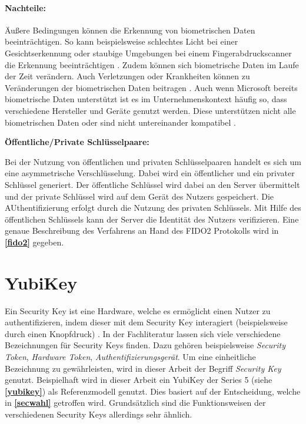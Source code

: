 \paragraph*{Nachteile:} Äußere Bedingungen können die Erkennung von biometrischen Daten beeinträchtigen. So kann beispielsweise schlechtes Licht bei einer Gesichtserkennung oder staubige Umgebungen bei einem Fingerabdruckscanner die Erkennung beeinträchtigen \cite{parmar2022comprehensive}. Zudem können sich biometrische Daten im Laufe der Zeit verändern. Auch Verletzungen oder Krankheiten können zu Veränderungen der biometrischen Daten beitragen \cite{boonkrong2012security}. Auch wenn Microsoft bereits biometrische Daten unterstützt ist es im Unternehmenskontext häufig so, dass verschiedene Hersteller und Geräte genutzt werden. Diese unterstützen nicht alle biometrischen Daten oder sind nicht untereinander kompatibel \cite{parmar2022comprehensive}.

\textbf{Öffentliche/Private Schlüsselpaare:}

Bei der Nutzung von öffentlichen und privaten Schlüsselpaaren handelt es sich um eine asymmetrische Verschlüsselung. Dabei wird ein öffentlicher und ein privater Schlüssel generiert. Der öffentliche Schlüssel wird dabei an den Server übermittelt und der private Schlüssel wird auf dem Gerät des Nutzers gespeichert. Die AUthentifizierung erfolgt durch die Nutzung des privaten Schlüssels. Mit Hilfe des öffentlichen Schlüssels kann der Server die Identität des Nutzers verifizieren. Eine genaue Beschreibung des Verfahrens an Hand des FIDO2 Protokolls wird in \textbf{\ref{fido2}} gegeben.


\section{YubiKey} \label{Yubikey}
Ein Security Key ist eine Hardware, welche es ermöglicht einen Nutzer zu authentifizieren, indem dieser mit dem Security Key interagiert (beispielsweise durch einen Knopfdruck) \cite{reynolds2018tale}. In der Fachliteratur lassen sich viele verschiedene Bezeichnungen für Security Keys finden. Dazu gehören beispielsweise \textit{Security Token}, \textit{Hardware Token}, \textit{Authentifizierungsgerät}. Um eine einheitliche Bezeichnung zu gewährleisten, wird in dieser Arbeit der Begriff \textit{Security Key} genutzt. Beispielhaft wird in dieser Arbeit ein YubiKey der Series 5 (siehe \textbf{\ref{yubikey}}) als Referenzmodell genutzt. Dies basiert auf der Entscheidung, welche in \textbf{\ref{secwahl}} getroffen wird. Grundsätzlich sind die Funktionsweisen der verschiedenen Security Keys allerdings sehr ähnlich.

